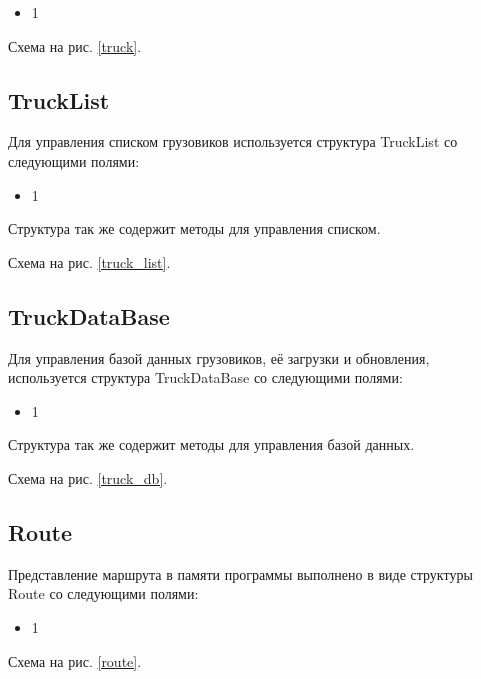 \begin{itemize}
    \item 1
\end{itemize}

Схема на рис. \ref{truck}.


\subsection{TruckList}

Для управления списком грузовиков используется структура TruckList со следующими полями:

\begin{itemize}
    \item 1
\end{itemize}

Структура так же содержит методы для управления списком.

Схема на рис. \ref{truck_list}.


\subsection{TruckDataBase}

Для управления базой данных грузовиков, 
её загрузки и обновления, 
используется структура TruckDataBase со следующими полями: 

\begin{itemize}
    \item 1
\end{itemize}

Структура так же содержит методы для управления базой данных.

Схема на рис. \ref{truck_db}.


\subsection{Route}

Представление маршрута в памяти программы выполнено в виде структуры Route со следующими полями:

\begin{itemize}
    \item 1
\end{itemize}

Схема на рис. \ref{route}.


